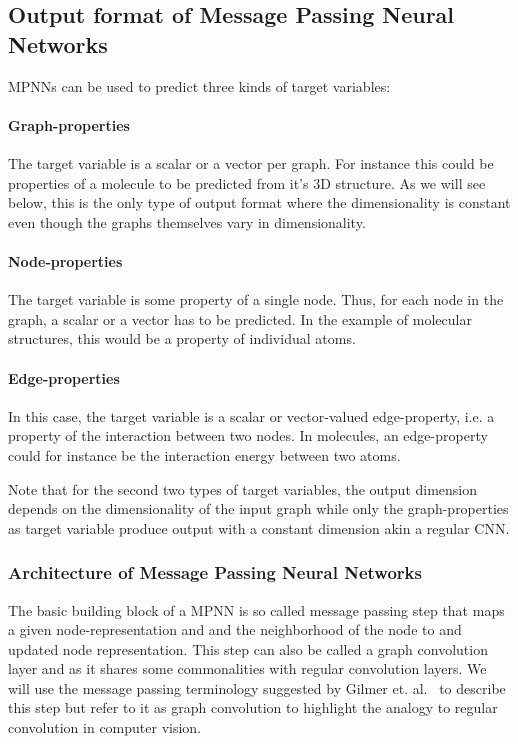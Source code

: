 \subsection{Output format of Message Passing Neural Networks}
\label{sec:graph-output}

MPNNs can be used to predict three kinds of target variables:

\paragraph{Graph-properties}
The target variable is a scalar or a vector per graph. For instance this could be properties of a molecule to be predicted from it's 3D structure. As we will see below, this is the only type of output format where the dimensionality is constant even though the graphs themselves vary in dimensionality.
\paragraph{Node-properties}
The target variable is some property of a single node. Thus, for each node in the graph, a scalar or a vector has to be predicted. In the example of molecular structures, this would be a property of individual atoms.
\paragraph{Edge-properties}
In this case, the target variable is a scalar or vector-valued edge-property, i.e. a property of the interaction between two nodes. In molecules, an edge-property could for instance be the interaction energy between two atoms.

Note that for the second two types of target variables, the output dimension depends on the dimensionality of the input graph while only the graph-properties as target variable produce output with a constant dimension akin a regular CNN.

\subsubsection{Architecture of Message Passing Neural Networks}


The basic building block of a MPNN is so called message passing step that maps a given node-representation and and the neighborhood of the node to and updated node representation. This step can also be called a graph convolution layer and as it shares some commonalities with regular convolution layers. We will use the message passing terminology suggested by Gilmer et. al.~\cite{Gilmer2017} to describe this step but refer to it as graph convolution to highlight the analogy to regular convolution in computer vision.

